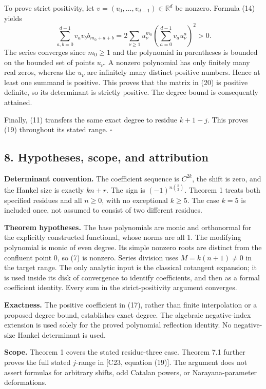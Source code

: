 \documentclass[
  11pt,
]{article}
\begin{document}
To prove strict positivity, let \(v=(v_0,\ldots,v_{d-1})\in\mathbb R^d\)
be nonzero. Formula (14) yields \[
 \sum_{a,b=0}^{d-1}v_av_b b_{m_0+a+b}
 =2\sum_{\nu\ge1}u_\nu^{m_0}
      \left(\sum_{a=0}^{d-1}v_a u_\nu^a\right)^2>0.
 \tag{22}
\] The series converges since \(m_0\ge1\) and the polynomial in
parentheses is bounded on the bounded set of points \(u_\nu\). A nonzero
polynomial has only finitely many real zeros, whereas the \(u_\nu\) are
infinitely many distinct positive numbers. Hence at least one summand is
positive. This proves that the matrix in (20) is positive definite, so
its determinant is strictly positive. The degree bound is consequently
attained.

Finally, (11) transfers the same exact degree to residue \(k+1-j\). This
proves (19) throughout its stated range. \(\square\)

\subsection{8. Hypotheses, scope, and attribution}\label{verification-audit-and-provenance}

\textbf{Determinant convention.} The coefficient sequence is \(C^{2k}\),
the shift is zero, and the Hankel size is exactly \(kn+r\). The sign is
\((-1)^{n\binom{k}{2}}\). Theorem 1 treats both specified residues and
all \(n\ge0\), with no exceptional \(k\ge5\). The case \(k=5\) is
included once, not assumed to consist of two different residues.

\textbf{Theorem hypotheses.} The base polynomials are monic and
orthonormal for the explicitly constructed functional, whose norms are
all 1. The modifying polynomial is monic of even degree. Its simple
nonzero roots are distinct from the confluent point 0, so (7) is
nonzero. Series division uses \(M=k(n+1)\ne0\) in the target range. The
only analytic input is the classical cotangent expansion; it is used
inside its disk of convergence to identify coefficients, and then as a
formal coefficient identity. Every sum in the strict-positivity argument
converges.

\textbf{Exactness.} The positive coefficient in (17), rather than finite
interpolation or a proposed degree bound, establishes exact degree. The
algebraic negative-index extension is used solely for the proved
polynomial reflection identity. No negative-size Hankel determinant is
used.

\textbf{Scope.} Theorem 1 covers the stated residue-three case.
Theorem 7.1 further proves the full stated \(j\)-range in {[}C23,
equation (19){]}. The argument does not assert formulas for arbitrary
shifts, odd Catalan powers, or Narayana-parameter deformations.
\end{document}
